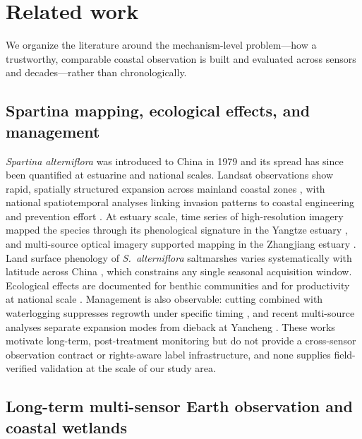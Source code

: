 \section{Related work}\label{sec:related}

We organize the literature around the mechanism-level problem---how a
trustworthy, comparable coastal observation is built and evaluated
across sensors and decades---rather than chronologically.

\subsection{Spartina mapping, ecological effects, and management}

\emph{Spartina alterniflora} was introduced to China in 1979 and its
spread has since been quantified at estuarine and national scales.
Landsat observations show rapid, spatially structured expansion across
mainland coastal zones \citep{liu2018rapid}, with national
spatiotemporal analyses linking invasion patterns to coastal
engineering and prevention effort \citep{mao2019rapid}. At estuary
scale, time series of high-resolution imagery mapped the species
through its phenological signature in the Yangtze estuary
\citep{ai2017phenology}, and multi-source optical imagery supported
mapping in the Zhangjiang estuary \citep{liu2017monitoring}. Land
surface phenology of \emph{S.~alterniflora} saltmarshes varies
systematically with latitude across China \citep{zhang2022latitudinal},
which constrains any single seasonal acquisition window. Ecological
effects are documented for benthic communities \citep{wang2010benthic}
and for productivity at national scale \citep{zheng2018productivity}.
Management is also observable: cutting combined with waterlogging
suppresses regrowth under specific timing
\citep{yuan2011cutting}, and recent multi-source analyses separate
expansion modes from dieback at Yancheng
\citep{yan2023monitoring}. These works motivate long-term,
post-treatment monitoring but do not provide a cross-sensor observation
contract or rights-aware label infrastructure, and none supplies
field-verified validation at the scale of our study area.

\subsection{Long-term multi-sensor Earth observation and coastal wetlands}

